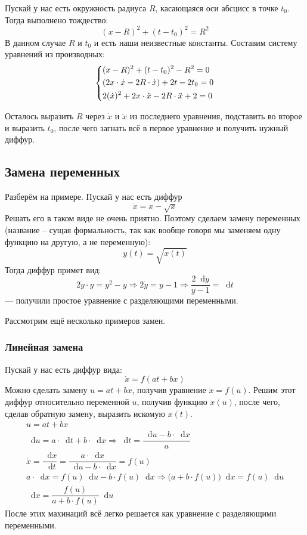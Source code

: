 \documentclass[a4paper,12pt]{article}
\renewcommand*\d{\mathop{}\!\mathrm{d}}
\newcommand{\dx}{\dot{x}}
\newcommand{\ddx}{\ddot{x}}
\begin{document}
Пускай у нас есть окружность радиуса $R$, касающаяся оси абсцисс в точке $t_0$. Тогда выполнено тождество:
\[(x - R)^2 + (t - t_0)^2 = R^2\]
В данном случае $R$ и $t_0$ и есть наши неизвестные константы. Составим систему уравнений из производных:
\[\left\{\begin{gathered}
(x - R)^2 + (t - t_0)^2 - R^2 = 0\hfill\\
(2x\cdot \dx - 2R \cdot \dx) + 2t - 2t_0 = 0\hfill\\
2(\dx)^2 + 2x\cdot \ddx - 2R \cdot \ddx + 2 = 0\hfill
\end{gathered}\right.\]

Осталось выразить $R$ через $\dx$ и $\ddx$ из последнего уравнения, подставить во второе и выразить $t_0$, после чего загнать всё в первое уравнение и получить нужный диффур. 

\subsection{Замена переменных}

Разберём на примере. Пускай у нас есть диффур \[\dot{x} = x - \sqrt{x}\] Решать его в таком виде не очень приятно. Поэтому сделаем замену переменных (название -- сущая формальность, так как вообще говоря мы заменяем одну функцию на другую, а не переменную): \[y(t) = \sqrt{x(t)}\] Тогда диффур примет вид:
\[2\dot{y}\cdot y = y^2 - y \Longrightarrow 2\dot{y} = y - 1 \Longrightarrow \dfrac{2\d y}{y - 1} = \d t\] --- получили простое уравнение с разделяющими переменными.

Рассмотрим ещё несколько примеров замен.

\subsubsection{Линейная замена}

Пускай у нас есть диффур вида:
\[\dx = f(at + bx)\]
Можно сделать замену $u = at + bx$, получив уравнение $\dx = f(u)$. Решим этот диффур относительно переменной $u$, получив функцию $x(u)$, после чего, сделав обратную замену, выразить искомую $x(t)$.
\begin{gather*}
	u = at + bx                                                                                        \\
	\d u = a\cdot \d t + b \cdot \d x \Longrightarrow \d t = \dfrac{\d u - b\cdot \d x}{a}             \\
	\dx = \dfrac{\d x}{\d t} = \dfrac{a \cdot \d x}{\d u - b \cdot \d x} = f(u)                        \\
	a \cdot \d x = f(u)\d u - b\cdot f(u)\d x \Longrightarrow \big(a + b\cdot f(u)\big)\d x = f(u)\d u \\
	\d x = \dfrac{f(u)}{a + b \cdot f(u)} \d u
\end{gather*}
После этих махинаций всё легко решается как уравнение с разделяющими переменными.
\end{document}
